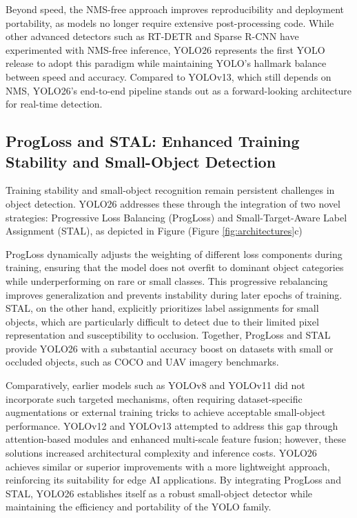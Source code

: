 \documentclass{article}
\begin{document}
Beyond speed, the NMS-free approach improves reproducibility and deployment portability, as models no longer require extensive post-processing code. While other advanced detectors such as RT-DETR and Sparse R-CNN have experimented with NMS-free inference, YOLO26 represents the first YOLO release to adopt this paradigm while maintaining YOLO’s hallmark balance between speed and accuracy. Compared to YOLOv13, which still depends on NMS, YOLO26’s end-to-end pipeline stands out as a forward-looking architecture for real-time detection.

\subsection{ProgLoss and STAL: Enhanced Training Stability and Small-Object Detection}

Training stability and small-object recognition remain persistent challenges in object detection. YOLO26 addresses these through the integration of two novel strategies: Progressive Loss Balancing (ProgLoss) and Small-Target-Aware Label Assignment (STAL), as depicted in Figure (Figure \ref{fig:architectures}c) 

ProgLoss dynamically adjusts the weighting of different loss components during training, ensuring that the model does not overfit to dominant object categories while underperforming on rare or small classes. This progressive rebalancing improves generalization and prevents instability during later epochs of training. STAL, on the other hand, explicitly prioritizes label assignments for small objects, which are particularly difficult to detect due to their limited pixel representation and susceptibility to occlusion. Together, ProgLoss and STAL provide YOLO26 with a substantial accuracy boost on datasets with small or occluded objects, such as COCO and UAV imagery benchmarks.  

Comparatively, earlier models such as YOLOv8 and YOLOv11 did not incorporate such targeted mechanisms, often requiring dataset-specific augmentations or external training tricks to achieve acceptable small-object performance. YOLOv12 and YOLOv13 attempted to address this gap through attention-based modules and enhanced multi-scale feature fusion; however, these solutions increased architectural complexity and inference costs. YOLO26 achieves similar or superior improvements with a more lightweight approach, reinforcing its suitability for edge AI applications. By integrating ProgLoss and STAL, YOLO26 establishes itself as a robust small-object detector while maintaining the efficiency and portability of the YOLO family.
\end{document}
